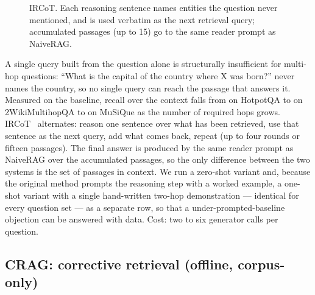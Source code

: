 \begin{figure}[t]
\centering
{}
\caption{IRCoT. Each reasoning sentence names entities the question never
mentioned, and is used verbatim as the next retrieval query; accumulated
passages (up to 15) go to the same reader prompt as NaiveRAG.}
\label{fig:arch-ircot}
\end{figure}

A single query built from the question alone is structurally insufficient
for multi-hop questions: ``What is the capital of the country where X was
born?'' never names the country, so no single query can reach the passage
that answers it. Measured on the baseline, recall over the context falls
from \NaiveRAGHotpotQARecallInContext{} on HotpotQA to
\NaiveRAGTwoWikiRecallInContext{} on 2WikiMultihopQA to
\NaiveRAGMuSiQueRecallInContext{} on MuSiQue as the number of required hops
grows. IRCoT~\citep{trivedi2023ircot} alternates: reason one sentence over
what has been retrieved, use that sentence as the next query, add what
comes back, repeat (up to four rounds or fifteen passages). The final
answer is produced by the same reader prompt as NaiveRAG over the
accumulated passages, so the only difference between the two systems is
the set of passages in context. We run a zero-shot variant and, because
the original method prompts the reasoning step with a worked example, a
one-shot variant with a single hand-written two-hop demonstration ---
identical for every question set --- as a separate row, so that a
under-prompted-baseline objection can be answered with data. Cost: two to
six generator calls per question.

\subsection{CRAG: corrective retrieval (offline, corpus-only)}
\label{sec:arch-crag}

